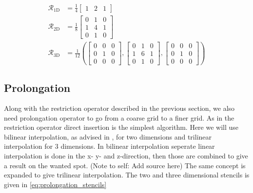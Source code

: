         	\begin{equation}
        		\begin{aligned}
        			\mathcal{R}_{1\text{D}} &= \frac{1}{4}
        			\begin{bmatrix}
        				1 & 2 & 1
        			\end{bmatrix}
        			\\
        			\mathcal{R}_{2\text{D}} &= \frac{1}{8}
        			\begin{bmatrix}
        				0 & 1 & 0
        				\\
        				1 & 4 & 1
        				\\
        				0 & 1 & 0
        			\end{bmatrix}
        			\\
        			\mathcal{R}_{3\text{D}} &= \frac{1}{12} \left(
        			\begin{bmatrix}
        				0 & 0 & 0
        				\\
        				0 & 1 & 0
        				\\
        				0 & 0 & 0
        			\end{bmatrix}
        			,
        			\begin{bmatrix}
        				0 & 1 & 0
        				\\
        				1 & 6 & 1
        				\\
        				0 & 1 & 0
        			\end{bmatrix}
        			,
        			\begin{bmatrix}
        				0 & 0 & 0
        				\\
        				0 & 1 & 0
        				\\
        				0 & 0 & 0
        			\end{bmatrix}
        			\right)
        			\label{eq:restriction_stencils}
        		\end{aligned}
        	\end{equation}

        \subsection{Prolongation}
            \label{sec:prol_simple}

            Along with the restriction operator described in the previous section, we also need prolongation
            operator to go from a coarse grid to a finer grid. As in the restriction
			operator direct insertion is the simplest algorithm.	Here we will use bilinear interpolation,
			as advised in \cite{trottenberg_multigrid_2000}, for
            two dimensions and trilinear interpolation for 3 dimensions. In bilinear interpolation seperate
            linear interpolation is done in the x- y- and z-direction, then those are combined to give a result
            on the wanted spot. (Note to self: Add source here) The same concept is expanded to give trilinear
            interpolation. The two and three dimensional stencils is given in \eqref{eq:prolongation_stencils}

